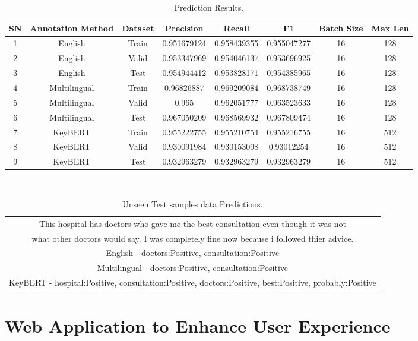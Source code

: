 \begin{table}[h!]
\centering
 \begin{tabular}{c c c c c c c c} 
 \hline
 SN & Annotation Method & Dataset & Precision & Recall & F1 & Batch Size & Max Len \\ [0.5ex] 
 \hline
 1 & English & Train & 0.951679124 & 0.958439355 & 0.955047277 & 16 & 128 \\ 
 2 & English & Valid & 0.953347969 & 0.954046137 & 0.953696925 & 16 & 128 \\ 
 3 & English & Test & 0.954944412 & 0.953828171 & 0.954385965 & 16 & 128 \\ 
 4 & Multilingual & Train & 0.96826887 & 0.969209084 & 0.968738749 & 16 & 128 \\
 5 & Multilingual & Valid & 0.965 & 0.962051777 & 0.963523633 & 16 & 128 \\
 6 & Multilingual & Test & 0.967050209 & 0.968569932 & 0.967809474 & 16 & 128 \\
 7 & KeyBERT & Train & 0.955222755 & 0.955210754 & 0.955216755 & 16 & 512 \\
 8 & KeyBERT & Valid & 0.930091984 & 0.930153098 & 0.93012254 & 16 & 512 \\
 9 & KeyBERT & Test & 0.932963279 & 0.932963279 & 0.932963279 & 16 & 512 \\ [1ex] 
 \hline
 \end{tabular}
 \caption{\label{tab:mytab3} Prediction Results.}
\end{table}
\\
\begin{table}[h!]
\centering
 \begin{tabular}{c} 
 \hline
 This hospital has doctors who gave me the best consultation even though it was not \\ what other doctors would say. I was completely fine now because i followed thier advice. \\ [0.5ex] 
 \hline
 English - doctors:Positive, consultation:Positive  \\ 
 Multilingual - doctors:Positive, consultation:Positive  \\
 KeyBERT - hospital:Positive, consultation:Positive, doctors:Positive, best:Positive, probably:Positive  \\ [1ex] 
 \hline
 \end{tabular}
 \caption{\label{tab:mytab4} Unseen Test samples data Predictions.}
\end{table}
\clearpage
\section{Web Application to Enhance User Experience}
